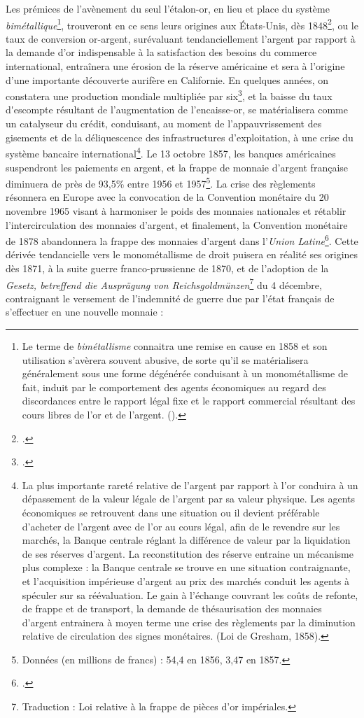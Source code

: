 { Les prémices de l'avènement du seul l'étalon-or, en lieu et place du système \emph{bimétallique}\footnote{Le terme de \emph{bimétallisme} connaitra une remise en cause en 1858 et son utilisation s'avèrera souvent abusive, de sorte qu'il se matérialisera généralement sous une forme dégénérée conduisant à un monométallisme de fait, induit par le comportement des agents économiques au regard des discordances entre le rapport légal fixe et le rapport commercial résultant des cours libres de l'or et de l'argent. ().}, trouveront en ce sens leurs origines aux États-Unis, dès 1848\footnote{.}, ou le taux de conversion or-argent, surévaluant tendanciellement l'argent par rapport à la demande d'or indispensable à la satisfaction des besoins du commerce international, entraînera une érosion de la réserve américaine et sera à l'origine d'une importante découverte aurifère en Californie. En quelques années, on constatera une production mondiale multipliée par six\footnote{.}, et la baisse du \gls{taux d'escompte} résultant de l'augmentation de l'encaisse-or, se matérialisera comme un catalyseur du crédit, conduisant, au moment de l'appauvrissement des gisements et de la déliquescence des infrastructures d'exploitation, à une crise du système bancaire international\footnote{La plus importante rareté relative de l'argent par rapport à l'or conduira à un dépassement de la valeur légale de l'argent par sa valeur physique. Les agents économiques se retrouvent dans une situation ou il devient préférable d'acheter de l'argent avec de l'or au cours légal, afin de le revendre sur les marchés, la Banque centrale réglant la différence de valeur par la liquidation de ses réserves d'argent. La reconstitution des réserve entraine un mécanisme plus complexe : la Banque centrale se trouve en une situation contraignante, et l'acquisition impérieuse d'argent au prix des marchés conduit les agents à spéculer sur sa réévaluation. Le gain à l'échange couvrant les coûts de refonte, de frappe et de transport, la demande de \gls{thésaurisation} des monnaies d'argent entrainera à moyen terme une crise des règlements par la diminution relative de circulation des signes monétaires. (\gls{Loi de Gresham}, 1858).}. Le 13 octobre 1857, les banques américaines suspendront les paiements en argent, et la frappe de monnaie d'argent française diminuera de près de 93,5\% entre 1956 et 1957\footnote{Données (en millions de francs) : 54,4 en 1856, 3,47 en 1857.}. La crise des règlements résonnera en Europe avec la convocation de la Convention monétaire du 20 novembre 1965 visant à harmoniser le poids des monnaies nationales et rétablir l'intercirculation des monnaies d'argent, et finalement, la Convention monétaire de 1878 abandonnera la frappe des monnaies d'argent dans l'\emph{Union Latine}\footnote{.}. Cette dérivée tendancielle vers le monométallisme de droit puisera en réalité ses origines dès 1871, à la suite guerre franco-prussienne de 1870, et de l'adoption de la \emph{Gesetz, betreffend die Ausprägung von Reichsgoldmünzen}\footnote{Traduction : Loi relative à la frappe de pièces d'or impériales.} du 4 décembre, contraignant le versement de l'indemnité de guerre due par l'état français de s'effectuer en une nouvelle monnaie : }
